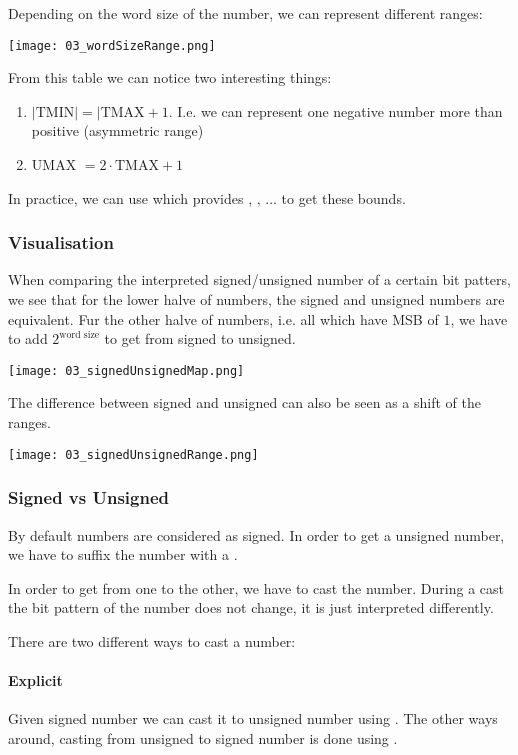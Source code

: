Depending on the word size of the number, we can represent different ranges:

\texttt{[image: 03\_wordSizeRange.png]}

From this table we can notice two interesting things:
\begin{enumerate}
    \item $|\text{TMIN}| = |\text{TMAX} + 1$. I.e. we can represent one negative number more than positive (asymmetric range)
    \item UMAX $= 2 \cdot \text{TMAX} + 1$
\end{enumerate}

In practice, we can use  which provides , , ... to get these bounds.

\subsubsection{Visualisation}
When comparing the interpreted signed/unsigned number of a certain bit patters, we see that for the lower halve of numbers, the signed and unsigned numbers are equivalent. Fur the other halve of numbers, i.e. all which have MSB of $1$, we have to add $2^{\text{word size}}$ to get from signed to unsigned. 

\texttt{[image: 03\_signedUnsignedMap.png]}

The difference between signed and unsigned can also be seen as a shift of the ranges.

\texttt{[image: 03\_signedUnsignedRange.png]}

\subsubsection{Signed vs Unsigned}
By default numbers are considered as signed. In order to get a unsigned number, we have to suffix the number with a .

In order to get from one to the other, we have to cast the number. During a cast the bit pattern of the number does not change, it is just interpreted differently.

There are two different ways to cast a number:

\paragraph{Explicit}
Given signed number  we can cast it to unsigned number  using . The other ways around, casting from unsigned  to signed number  is done using .

